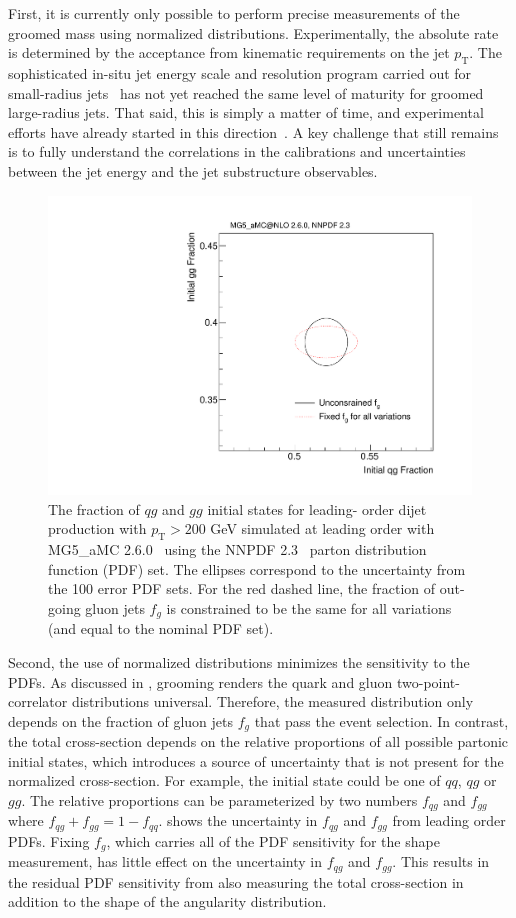 First, it is currently only possible to perform precise measurements of the groomed mass using normalized distributions.
%
Experimentally, the absolute rate is determined by the acceptance from kinematic requirements on the jet $p_\text{T}$.
%
The sophisticated in-situ jet energy scale and resolution program carried out for small-radius jets~\cite{Aad:2014bia,Aaboud:2017jcu,Khachatryan:2016kdb,CMS-DP-2016-020} has not yet reached the same level of maturity for groomed large-radius jets.
%
That said, this is simply a matter of time, and experimental efforts have already started in this direction~\cite{ATLAS-CONF-2017-063}.
%
A key challenge that still remains is to fully understand the correlations in the calibrations and uncertainties between the jet energy and the jet substructure observables.

\begin{figure}[t]
\begin{center}
\includegraphics[width = 0.5\columnwidth]{figures/PDFs.pdf}
\end{center}
\caption{The fraction of $qg$ and $gg$ initial states for leading- order dijet production with $p_\text{T}>200$ GeV simulated at leading order with MG5\_aMC 2.6.0~\cite{Alwall:2014hca} using the NNPDF 2.3~\cite{Ball:2012cx} parton distribution function (PDF) set.  The ellipses correspond to the uncertainty from the 100 error PDF sets.  For the red dashed line, the fraction of out-going gluon jets $f_g$ is constrained to be the same for all variations (and equal to the nominal PDF set).}
\label{fig:pdf}
\end{figure}

Second, the use of normalized distributions minimizes the sensitivity to the PDFs.
%
As discussed in , grooming renders the quark and gluon two-point-correlator distributions universal.
%
Therefore, the measured distribution only depends on the fraction of gluon jets $f_g$ that pass the event selection.
%
In contrast, the total cross-section depends on the relative proportions of all possible partonic initial states, which introduces a source of uncertainty that is not present for the normalized cross-section.
%
For example, the initial state could be one of $qq$, $qg$ or $gg$.
%
The relative proportions can be parameterized by two numbers $f_{qg}$ and $f_{gg}$ where $f_{qg}+f_{gg}=1-f_{qq}$.
%
 shows the uncertainty in $f_{qg}$ and $f_{gg}$ from leading order PDFs.
%
Fixing $f_g$, which carries all of the PDF sensitivity for the shape measurement, has little effect on the uncertainty in $f_{qg}$ and $f_{gg}$.
%
This results in the residual PDF sensitivity from also measuring the total cross-section in addition to the shape of the angularity distribution.

